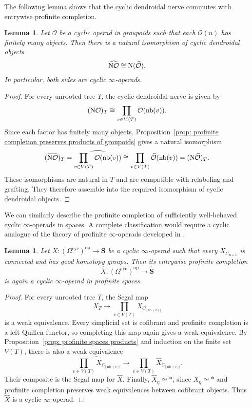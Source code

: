 \documentclass{amsart}
\newcommand{\calO}{\mathcal{O}}
\newcommand{\sSet}{\mathbf{S}}
\newcommand{\nerve}{\textnormal{N}}
\newtheorem{lemma}[theorem]{Lemma}%
\theoremstyle{definition}
\numberwithin{equation}{section}
\begin{document}
The following lemma shows that the cyclic dendroidal nerve commutes
with entrywise profinite completion.

\begin{lemma}
\label{lemma: nerve commutes with profinite completion}
Let $\calO$ be a cyclic operad in groupoids such that each
$\calO(n)$ has finitely many objects. Then there is a natural
isomorphism of cyclic dendroidal objects
\[
\widehat{\nerve\calO}
\cong
\nerve(\widehat{\calO}).
\]
In particular, both sides are cyclic $\infty$-operads.
\end{lemma}

\begin{proof}
For every unrooted tree $T$, the cyclic dendroidal nerve is given by
\[
(\nerve\calO)_T
\cong
\prod_{v\in V(T)}\calO(\operatorname{nb}(v)).
\]
Since each factor has finitely many objects,
Proposition~\ref{prop: profinite completion preserves products of groupoids}
gives a natural isomorphism
\[
(\widehat{\nerve\calO})_T
=
\widehat{\prod_{v\in V(T)}
\calO(\operatorname{nb}(v))}
\cong
\prod_{v\in V(T)}
\widehat{\calO}(\operatorname{nb}(v))
=
(\nerve\widehat{\calO})_T.
\]
These isomorphisms are natural in $T$ and are compatible with
relabeling and grafting. They therefore assemble into the required
isomorphism of cyclic dendroidal objects.
\end{proof}

We can similarly describe the profinite completion of sufficiently
well-behaved cyclic $\infty$-operads in spaces. A complete
classification would require a cyclic analogue of the theory of
profinite $\infty$-operads developed in \cite{BM22}.

\begin{lemma}
\label{lemma: profinite completion of cyclic infinity operads in spaces}
Let
$X\colon(\Omega^{\mathrm{cyc}})^{\mathrm{op}}\to\sSet$
be a cyclic $\infty$-operad such that every
$X_{C_{n+1}}$ is connected and has good homotopy groups. Then its
entrywise profinite completion
\[
\widehat X\colon
(\Omega^{\mathrm{cyc}})^{\mathrm{op}}
\longrightarrow
\widehat{\sSet}
\]
is again a cyclic $\infty$-operad in profinite spaces.
\end{lemma}

\begin{proof}
For every unrooted tree $T$, the Segal map
\[
X_T\longrightarrow
\prod_{v\in V(T)}X_{C_{|\operatorname{nb}(v)|}}
\]
is a weak equivalence. Every simplicial set is cofibrant and
profinite completion is a left Quillen functor, so completing this
map again gives a weak equivalence. By
Proposition~\ref{prop: profinite spaces products} and induction on the
finite set $V(T)$, there is also a weak equivalence
\[
\widehat{\prod_{v\in V(T)}
X_{C_{|\operatorname{nb}(v)|}}}
\longrightarrow
\prod_{v\in V(T)}
\widehat X_{C_{|\operatorname{nb}(v)|}}.
\]
Their composite is the Segal map for $\widehat X$. Finally,
$\widehat X_\eta\simeq *$, since $X_\eta\simeq *$ and profinite
completion preserves weak equivalences between cofibrant objects.
Thus $\widehat X$ is a cyclic $\infty$-operad.
\end{proof}
\end{document}
